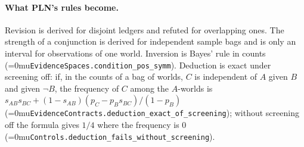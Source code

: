 \documentclass[11pt]{article}
\newcommand{\leanname}[1]{\textup{\Urlmuskip=0mu\relax\nolinkurl{#1}}}
\theoremstyle{definition}
\theoremstyle{remark}
\begin{document}
\paragraph{What PLN's rules become.}
Revision is derived for disjoint ledgers and refuted for overlapping ones.  The
strength of a conjunction is derived for independent sample bags and is only
an interval for observations of one world.  Inversion is Bayes' rule in counts
(\leanname{EvidenceSpaces.condition_pos_symm}).  Deduction is exact under
screening off: if, in the counts of a bag of worlds, $C$ is independent of $A$
given $B$ and given $\neg B$, the frequency of $C$ among the $A$-worlds is
$s_{AB}s_{BC}+(1-s_{AB})(p_C-p_Bs_{BC})/(1-p_B)$
(\leanname{EvidenceContracts.deduction_exact_of_screening}); without screening
off the formula gives $1/4$ where the frequency is $0$
(\leanname{Controls.deduction_fails_without_screening}).
\end{document}
